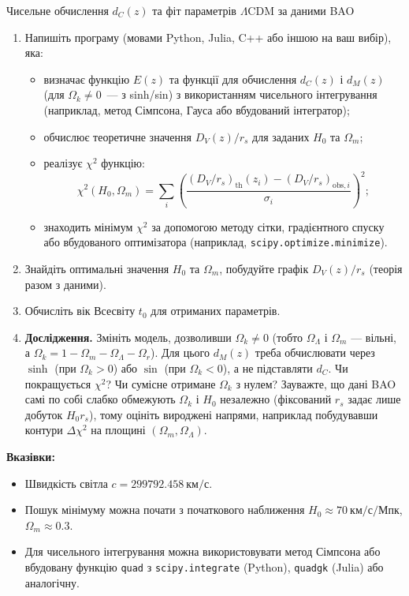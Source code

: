 \begin{problem}{Чисельне обчислення $d_C(z)$ та фіт параметрів $\Lambda$CDM за даними BAO}
\begin{enumerate}
    \item Напишіть програму (мовами Python, Julia, C++ або іншою на ваш вибір),
          яка:
          \begin{itemize}
              \item визначає функцію $E(z)$ та функції для обчислення $d_C(z)$
                    і $d_M(z)$ (для $\Omega_k\neq0$~--- з sinh/sin) з використанням чисельного інтегрування (наприклад, метод
                    Сімпсона, Гауса або вбудований інтегратор);
              \item обчислює теоретичне значення $D_V(z)/r_s$ для заданих
                    $H_0$ та $\Omega_m$;
              \item реалізує $\chi^2$ функцію:
                    \[
                        \chi^2(H_0, \Omega_m) = \sum_{i} \left( \frac{ (D_V/r_s)_{\text{th}}(z_i) - (D_V/r_s)_{\text{obs},i} }{\sigma_i} \right)^2;
                    \]
              \item знаходить мінімум $\chi^2$ за допомогою методу
                    сітки, градієнтного спуску або вбудованого оптимізатора
                    (наприклад, \texttt{scipy.optimize.minimize}).
          \end{itemize}

    \item Знайдіть оптимальні значення $H_0$ та $\Omega_m$,
          побудуйте графік $D_V(z)/r_s$ (теорія разом з даними).

    \item Обчисліть вік Всесвіту $t_0$ для отриманих параметрів.

    \item \textbf{Дослідження.} Змініть модель, дозволивши $\Omega_k \neq 0$
          (тобто $\Omega_\Lambda$ і $\Omega_m$ --- вільні, а $\Omega_k = 1 - \Omega_m - \Omega_\Lambda - \Omega_r$).
          Для цього $d_M(z)$ треба обчислювати через $\sinh$ (при $\Omega_k>0$) або $\sin$ (при $\Omega_k<0$), а не підставляти $d_C$. Чи покращується $\chi^2$? Чи сумісне отримане $\Omega_k$ з нулем? Зауважте, що дані BAO самі по собі слабко обмежують $\Omega_k$ і $H_0$ незалежно (фіксований $r_s$ задає лише добуток $H_0 r_s$), тому оцініть вироджені напрями, наприклад побудувавши контури $\Delta\chi^2$ на площині $(\Omega_m,\Omega_\Lambda)$.
\end{enumerate}

\textbf{Вказівки:}
\begin{itemize}
    \item Швидкість світла $c = 299792.458\ \text{км/с}$.
    \item Пошук мінімуму можна почати з початкового наближення
          $H_0 \approx 70\ \text{км/с/Мпк}$, $\Omega_m \approx 0.3$.
    \item Для чисельного інтегрування можна використовувати метод
          Сімпсона або вбудовану функцію \texttt{quad} з \texttt{scipy.integrate}
          (Python), \texttt{quadgk} (Julia) або аналогічну.
\end{itemize}
\end{problem}